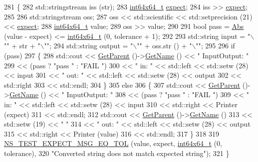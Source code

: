 \begin{DoxyCode}
281 \{
282   std::stringstream iss (str);
283   \hyperlink{classint64x64__t}{int64x64\_t} \hyperlink{doc_2readme_8txt_a11460adc33d00ccf94a559cdd45990ea}{expect};
284   iss >> \hyperlink{doc_2readme_8txt_a11460adc33d00ccf94a559cdd45990ea}{expect};
285 
286   std::stringstream oss;
287   oss << std::scientific << std::setprecision (21) << \hyperlink{doc_2readme_8txt_a11460adc33d00ccf94a559cdd45990ea}{expect};
288   \hyperlink{classint64x64__t}{int64x64\_t} value;
289   oss >> value;
290 
291   \textcolor{keywordtype}{bool} pass = \hyperlink{group__highprec_gabf87260a0ba68d152ae95568b2ef58fe}{Abs} (value - expect) <= \hyperlink{classint64x64__t}{int64x64\_t} (0, tolerance + 1);
292 
293   std::string input  = \textcolor{stringliteral}{"\(\backslash\)""} + str + \textcolor{stringliteral}{"\(\backslash\)""};
294   std::string output = \textcolor{stringliteral}{"\(\backslash\)""} + oss.str () + \textcolor{stringliteral}{"\(\backslash\)""};
295 
296   \textcolor{keywordflow}{if} (pass)
297     \{
298       std::cout << \hyperlink{classns3_1_1TestCase_af41db0462b844c9f81838d0e61ecd563}{GetParent} ()->\hyperlink{classns3_1_1TestCase_a28f7bb59669c24dae1c290fc17fc9b62}{GetName} () << \textcolor{stringliteral}{" InputOutput: "}
299                 << (pass ? \textcolor{stringliteral}{"pass "} : \textcolor{stringliteral}{"FAIL "})
300                 << \textcolor{stringliteral}{" in:  "} << std::left << std::setw (28) << input
301                 << \textcolor{stringliteral}{" out: "} << std::left << std::setw (28) << output
302                 << std::right
303                 << std::endl;
304     \}
305   \textcolor{keywordflow}{else}
306     \{
307       std::cout << \hyperlink{classns3_1_1TestCase_af41db0462b844c9f81838d0e61ecd563}{GetParent} ()->\hyperlink{classns3_1_1TestCase_a28f7bb59669c24dae1c290fc17fc9b62}{GetName} () << \textcolor{stringliteral}{" InputOutput: "}
308                 << (pass ? \textcolor{stringliteral}{"pass "} : \textcolor{stringliteral}{"FAIL "})
309                 << \textcolor{stringliteral}{" in:  "} << std::left << std::setw (28) << input
310                 << std::right << Printer (expect)
311                 << std::endl;
312       std::cout << \hyperlink{classns3_1_1TestCase_af41db0462b844c9f81838d0e61ecd563}{GetParent} ()->\hyperlink{classns3_1_1TestCase_a28f7bb59669c24dae1c290fc17fc9b62}{GetName} ()
313                 << std::setw (19) << \textcolor{stringliteral}{" "}
314                 << \textcolor{stringliteral}{" out: "} << std::left << std::setw (28) << output
315                 << std::right << Printer (value)
316                 << std::endl;
317     \}      
318 
319   \hyperlink{group__testing_ga7927b376d1fed5e576c7a3d69d26e8a0}{NS\_TEST\_EXPECT\_MSG\_EQ\_TOL} (value, expect, \hyperlink{classint64x64__t}{int64x64\_t} (0, tolerance),
320                              \textcolor{stringliteral}{"Converted string does not match expected string"});
321 \}
\end{DoxyCode}


